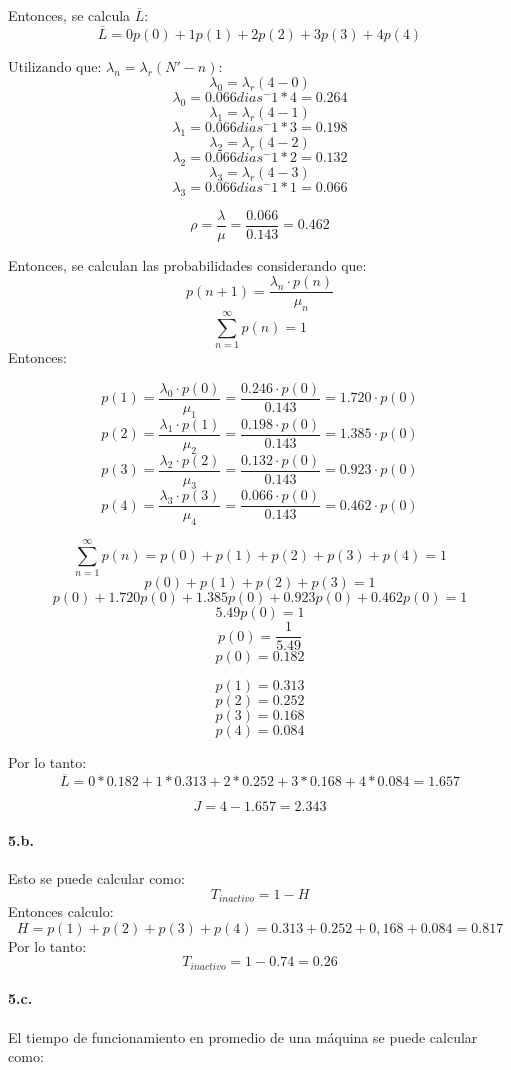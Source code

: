 \documentclass{article}
\begin{document}
  Entonces, se calcula $\overline{L}$:
  $$\overline{L} = 0 p(0) + 1 p(1) + 2 p(2) + 3 p(3) + 4 p(4) $$

  Utilizando que: $\lambda_n = \lambda_r (N' - n)$:
    $$\lambda_0 = \lambda_r (4 - 0)$$
    $$\lambda_0 = 0.066 dias^-1 * 4 = 0.264 $$
    $$\lambda_1 = \lambda_r (4 - 1)$$
    $$\lambda_1 = 0.066 dias^-1 * 3 = 0.198 $$
    $$\lambda_2 = \lambda_r (4 - 2)$$
    $$\lambda_2 = 0.066 dias^-1 * 2 = 0.132 $$
    $$\lambda_3 = \lambda_r (4 - 3)$$
    $$\lambda_3 = 0.066 dias^-1 * 1 = 0.066 $$
    
    $$\rho = \frac{\lambda}{\mu} = \frac{0.066}{0.143}=0.462 $$ 

  Entonces, se calculan las probabilidades considerando que:
      $$ p(n+1) = \frac{\lambda_n \cdot p(n)}{\mu_n}$$
    $$ \sum _{n=1}^{\infty} {p(n)} = 1$$
  Entonces:

    $$ p(1) = \frac{\lambda_0 \cdot p(0)}{\mu_1} = \frac{0.246 \cdot p(0)}{0.143} = 1.720 \cdot p(0)  $$
    $$ p(2) = \frac{\lambda_1 \cdot p(1)}{\mu_2} = \frac{0.198 \cdot p(0)}{0.143} = 1.385 \cdot p(0) $$
    $$ p(3) = \frac{\lambda_2 \cdot p(2)}{\mu_3} = \frac{0.132 \cdot p(0)}{0.143} = 0.923 \cdot p(0)$$
    $$ p(4) = \frac{\lambda_3 \cdot p(3)}{\mu_4} = \frac{0.066 \cdot p(0)}{0.143} = 0.462 \cdot p(0)$$

    $$ \sum _{n=1}^{\infty} {p(n)} = p(0) + p(1) + p(2) + p(3) + p(4) = 1$$
    $$p(0) + p(1) + p(2) + p(3) = 1$$
    $$p(0) + 1.720 p(0) + 1.385 p(0) + 0.923 p(0) + 0.462 p(0) = 1$$
    $$5.49 p(0) = 1$$
    $$p(0) = \frac{1}{5.49}$$
    $$p(0) = 0.182$$

  $$p(1) = 0.313$$
  $$p(2) = 0.252$$
  $$p(3) = 0.168$$
  $$p(4) = 0.084$$

Por lo tanto:
$$\overline{L} = 0 * 0.182 + 1 * 0.313 + 2 * 0.252 + 3 * 0.168 + 4 * 0.084 = 1.657 $$

$$J = 4 - 1.657 = 2.343 $$
  
\paragraph{5.b.} Esto se puede calcular como:
  $$T_{inactivo} = 1 - H$$
 Entonces calculo:
  $$H = p(1) + p(2) + p(3) + p(4) = 0.313 + 0.252 + 0,168 + 0.084 = 0.817$$
Por lo tanto:
  $$T_{inactivo} = 1 - 0.74 = 0.26$$

\paragraph{5.c.} El tiempo de funcionamiento en promedio de una m\'aquina se puede calcular como:
\end{document}
